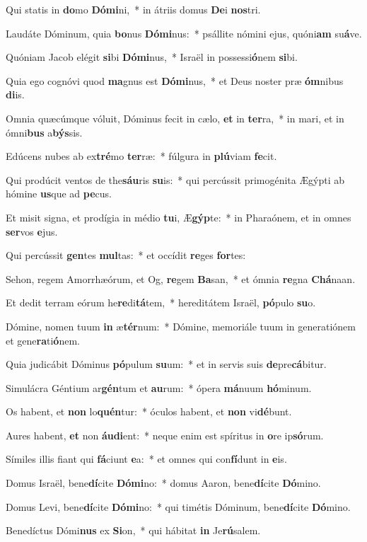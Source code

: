 \item Qui statis in \textbf{do}mo \textbf{Dó}\textbf{mi}ni,~* in átriis domus \textbf{De}i \textbf{nos}tri.
\item Laudáte Dóminum, quia \textbf{bo}nus \textbf{Dó}\textbf{mi}nus:~* psállite nómini ejus, quóni\textbf{am} su\textbf{á}ve.
\item Quóniam Jacob elégit \textbf{si}bi \textbf{Dó}\textbf{mi}nus,~* Israël in possessi\textbf{ó}nem \textbf{si}bi.
\item Quia ego cognóvi quod \textbf{ma}gnus est \textbf{Dó}\textbf{mi}nus,~* et Deus noster præ \textbf{óm}nibus \textbf{di}is.
\item Omnia quæcúmque vóluit, Dóminus fecit in cælo, \textbf{et} in \textbf{ter}ra,~* in mari, et in ómni\textbf{bus} a\textbf{býs}sis.
\item Edúcens nubes ab ex\textbf{tré}mo \textbf{ter}ræ:~* fúlgura in \textbf{plú}viam \textbf{fe}cit.
\item Qui prodúcit ventos de the\textbf{sáu}ris \textbf{su}is:~* qui percússit primogénita Ægýpti ab hómine \textbf{us}que ad \textbf{pe}cus.
\item Et misit signa, et prodígia in médio \textbf{tu}i, Æ\textbf{gýp}te:~* in Pharaónem, et in omnes \textbf{ser}vos \textbf{e}jus.
\item Qui percússit \textbf{gen}tes \textbf{mul}tas:~* et occídit \textbf{re}ges \textbf{for}tes:
\item Sehon, regem Amorrhæórum, et Og, \textbf{re}gem \textbf{Ba}san,~* et ómnia \textbf{re}gna \textbf{Chá}naan.
\item Et dedit terram eórum he\textbf{re}di\textbf{tá}tem,~* hereditátem Israël, \textbf{pó}pulo \textbf{su}o.
\item Dómine, nomen tuum \textbf{in} æ\textbf{tér}num:~* Dómine, memoriále tuum in generatiónem et gene\textbf{ra}ti\textbf{ó}nem.
\item Quia judicábit Dóminus \textbf{pó}pulum \textbf{su}um:~* et in servis suis \textbf{de}pre\textbf{cá}bitur.
\item Simulácra Géntium ar\textbf{gén}tum et \textbf{au}rum:~* ópera \textbf{má}nuum \textbf{hó}minum.
\item Os habent, et \textbf{non} lo\textbf{quén}tur:~* óculos habent, et \textbf{non} vi\textbf{dé}bunt.
\item Aures habent, \textbf{et} non \textbf{áu}\textbf{di}ent:~* neque enim est spíritus in \textbf{o}re ip\textbf{só}rum.
\item Símiles illis fiant qui \textbf{fá}ciunt \textbf{e}a:~* et omnes qui con\textbf{fí}dunt in \textbf{e}is.
\item Domus Israël, bene\textbf{dí}cite \textbf{Dó}\textbf{mi}no:~* domus Aaron, bene\textbf{dí}cite \textbf{Dó}mino.
\item Domus Levi, bene\textbf{dí}cite \textbf{Dó}\textbf{mi}no:~* qui timétis Dóminum, bene\textbf{dí}cite \textbf{Dó}mino.
\item Benedíctus Dómi\textbf{nus} ex \textbf{Si}on,~* qui hábitat \textbf{in} Je\textbf{rú}salem.
